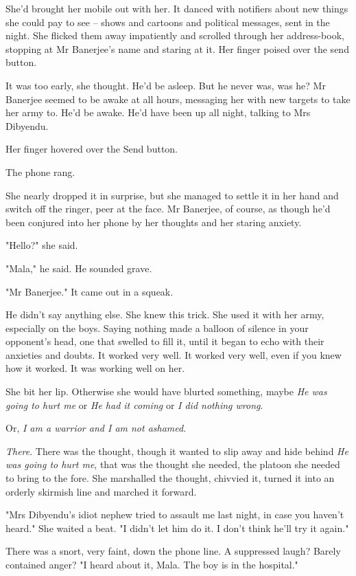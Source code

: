 She'd brought her mobile out with her. It danced with notifiers
about new things she could pay to see -- shows and cartoons and
political messages, sent in the night. She flicked them away
impatiently and scrolled through her address-book, stopping at Mr
Banerjee's name and staring at it. Her finger poised over the send
button.

It was too early, she thought. He'd be asleep. But he never was,
was he? Mr Banerjee seemed to be awake at all hours, messaging her
with new targets to take her army to. He'd be awake. He'd have been
up all night, talking to Mrs Dibyendu.

Her finger hovered over the Send button.

The phone rang.

She nearly dropped it in surprise, but she managed to settle it in
her hand and switch off the ringer, peer at the face. Mr Banerjee,
of course, as though he'd been conjured into her phone by her
thoughts and her staring anxiety.

"Hello?" she said.

"Mala," he said. He sounded grave.

"Mr Banerjee." It came out in a squeak.

He didn't say anything else. She knew this trick. She used it with
her army, especially on the boys. Saying nothing made a balloon of
silence in your opponent's head, one that swelled to fill it, until
it began to echo with their anxieties and doubts. It worked very
well. It worked very well, even if you knew how it worked. It was
working well on her.

She bit her lip. Otherwise she would have blurted something, maybe
\emph{He was going to hurt me} or \emph{He had it coming} or
\emph{I did nothing wrong}.

Or, \emph{I am a warrior and I am not ashamed}.

\emph{There}. There was the thought, though it wanted to slip away
and hide behind \emph{He was going to hurt me}, that was the
thought she needed, the platoon she needed to bring to the fore.
She marshalled the thought, chivvied it, turned it into an orderly
skirmish line and marched it forward.

"Mrs Dibyendu's idiot nephew tried to assault me last night, in
case you haven't heard." She waited a beat. "I didn't let him do
it. I don't think he'll try it again."

There was a snort, very faint, down the phone line. A suppressed
laugh? Barely contained anger? "I heard about it, Mala. The boy is
in the hospital."

